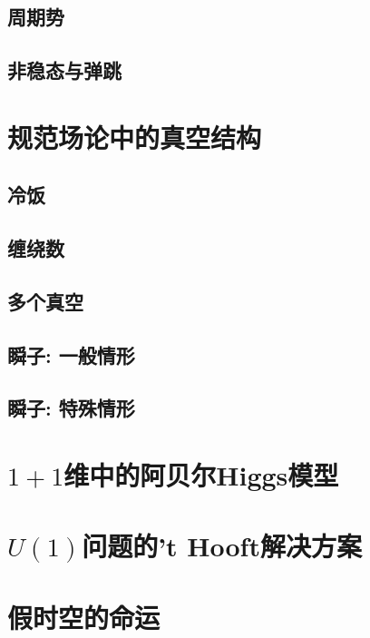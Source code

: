 \subsection{周期势}

\subsection{非稳态与弹跳}


\section{规范场论中的真空结构}

\subsection{冷饭}

\subsection{缠绕数}

\subsection{多个真空}

\subsection{瞬子: 一般情形}

\subsection{瞬子: 特殊情形}

\section{$1+1$维中的阿贝尔Higgs模型}

\section{$U(1)$问题的't Hooft解决方案}


\section{假时空的命运}
